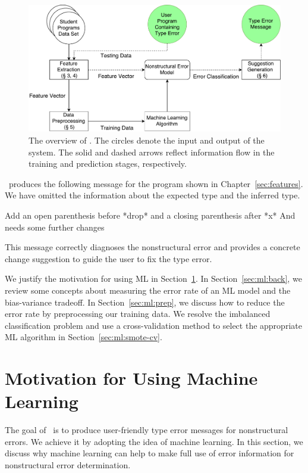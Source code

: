 \documentclass[12pt]{report}	%
\begin{document}
\begin{figure}
\centering
\includegraphics[scale=.6]{images/Learnskell.pdf}
\caption[The overview of \newCompiler]{The overview of \newCompiler. The circles denote the input
and output of the system. 
The solid and dashed arrows
reflect information flow in the training and prediction
stages, respectively.
}
\label{fig:arch}
\end{figure}

\newCompiler\ produces the following message
for the  program shown in Chapter~\ref{sec:features}.
We have omitted
the information about the expected type and the inferred type.
%
\begin{program}
Add an open parenthesis before *drop* and a closing parenthesis after *x*
And needs some further changes
\end{program}
%
This message correctly diagnoses the nonstructural error and 
provides a concrete change suggestion to guide the user to fix
the type error. 


We justify the motivation for using ML in Section~\ref{sec:ml:motivation}.
In Section~\ref{sec:ml:back}, we review some concepts about
measuring the error rate of an ML model
and the bias-variance tradeoff.
In Section~\ref{sec:ml:prep}, we discuss
how to reduce the error rate by preprocessing our training data.
We resolve the
imbalanced classification problem
and use a cross-validation method to
select the appropriate ML algorithm in Section~\ref{sec:ml:smote-cv}.


\section{Motivation for Using Machine Learning}
\label{sec:ml:motivation}

The goal of \newCompiler\ is to produce
user-friendly type error messages for nonstructural errors.
We achieve it by adopting the idea of machine learning.
In this section, we discuss why machine learning
can help to make full use of error information for
nonstructural error determination.
\end{document}
